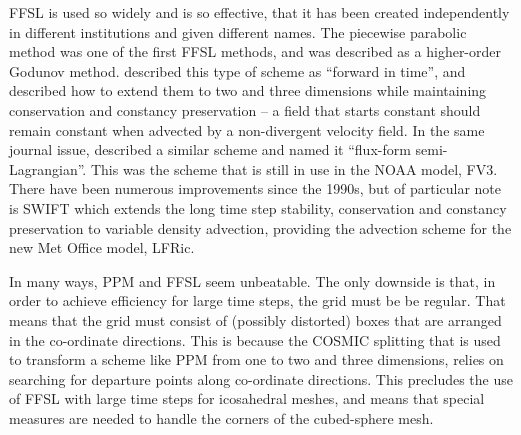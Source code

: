 FFSL is used so widely and is so effective, that it has been created
independently in different institutions and given different names.
The piecewise parabolic method \citep[PPM,][]{CW84} was one of the
first FFSL methods, and was described as a higher-order Godunov method.
\citet{LLM96} described this type of scheme as ``forward in time'',
and described how to extend them to two and three dimensions while
maintaining conservation and constancy preservation -- a field that
starts constant should remain constant when advected by a non-divergent
velocity field. In the same journal issue, \citet{LR96} described
a similar scheme and named it ``flux-form semi-Lagrangian''. This
was the scheme that is still in use in the NOAA model, FV3. There
have been numerous improvements since the 1990s, but of particular
note is SWIFT \citep{BK25} which extends the long time step stability,
conservation and constancy preservation to variable density advection,
providing the advection scheme for the new Met Office model, LFRic. 

In many ways, PPM and FFSL seem unbeatable. The only downside is that,
in order to achieve efficiency for large time steps, the grid must
be be regular. That means that the grid must consist of (possibly
distorted) boxes that are arranged in the co-ordinate directions.
This is because the COSMIC splitting that is used to transform a scheme
like PPM from one to two and three dimensions, relies on searching
for departure points along co-ordinate directions. This precludes
the use of FFSL with large time steps for icosahedral meshes, and
means that special measures are needed to handle the corners of the
cubed-sphere mesh. 

